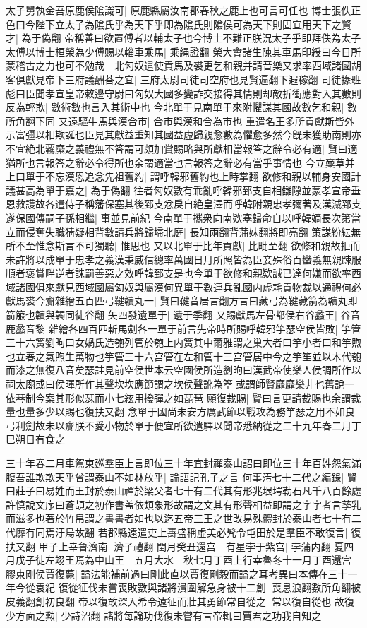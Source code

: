 太子舅執金吾原鹿侯隂識可|{
	原鹿縣屬汝南郡春秋之鹿上也可言可任也}
博士張佚正色曰今陛下立太子為隂氏乎為天下乎即為隂氏則隂侯可為天下則固宜用天下之賢才|{
	為于偽翻}
帝稱善曰欲置傅者以輔太子也今博士不難正朕況太子乎即拜佚為太子太傅以博士桓榮為少傅賜以輜車乘馬|{
	乘䋲證翻}
榮大會諸生陳其車馬印綬曰今日所蒙稽古之力也可不勉哉　北匈奴遣使貢馬及裘更乞和親并請音樂又求率西域諸國胡客俱獻見帝下三府議酬荅之宜|{
	三府太尉司徒司空府也見賢遍翻下遐稼翻}
司徒掾班彪曰臣聞孝宣皇帝敕邊守尉曰匈奴大國多變詐交接得其情則却敵折衝應對入其數則反為輕欺|{
	數術數也言入其術中也}
今北單于見南單于來附懼謀其國故數乞和親|{
	數所角翻下同}
又遠驅牛馬與漢合市|{
	合市與漢和合為市也}
重遣名王多所貢獻斯皆外示富彊以相欺誕也臣見其獻益重知其國益虚歸親愈數為懼愈多然今旣未獲助南則亦不宜絶北覊縻之義禮無不答謂可頗加賞賜略與所獻相當報答之辭令必有適|{
	賢曰適猶所也言報答之辭必令得所也余謂適當也言報答之辭必有當乎事情也}
今立稾草并上曰單于不忘漢恩追念先祖舊約|{
	謂呼韓邪舊約也上時掌翻}
欲修和親以輔身安國計議甚高為單于嘉之|{
	為于偽翻}
往者匈奴數有乖亂呼韓邪郅支自相讎隙並蒙孝宣帝垂恩救護故各遣侍子稱藩保塞其後郅支忿戾自絶皇澤而呼韓附親忠孝彌著及漢滅郅支遂保國傳嗣子孫相繼|{
	事並見前紀}
今南單于攜衆向南欵塞歸命自以呼韓嫡長次第當立而侵奪失職猜疑相背數請兵將歸埽北庭|{
	長知兩翻背蒲妹翻將即亮翻}
策謀紛紜無所不至惟念斯言不可獨聽|{
	惟思也}
又以北單于比年貢獻|{
	比毗至翻}
欲修和親故拒而未許將以成單于忠孝之義漢秉威信總率萬國日月所照皆為臣妾殊俗百蠻義無親踈服順者褒賞畔逆者誅罰善惡之效呼韓郅支是也今單于欲修和親欵誠已達何嫌而欲率西域諸國俱來獻見西域國屬匈奴與屬漢何異單于數連兵亂國内虚耗貢物裁以通禮何必獻馬裘今齎雜繒五百匹弓鞬韥丸一|{
	賢曰鞬音居言翻方言曰藏弓為鞬藏箭為韥丸即箭箙也韥與韣同徒谷翻}
矢四發遺單于|{
	遺于季翻}
又賜獻馬左骨都侯右谷蠡王|{
	谷音鹿蠡音黎}
雜繒各四百匹斬馬劍各一單于前言先帝時所賜呼韓邪竽瑟空侯皆敗|{
	竽管三十六簧劉昫曰女媧氏造匏列管於匏上内簧其中爾雅謂之巢大者曰竽小者曰和竽煦也立春之氣煦生萬物也竽管三十六宫管在左和管十三宫管居中今之竽笙並以木代匏而漆之無復八音矣瑟註見前空侯世本云空國侯所造劉昫曰漢武帝使樂人侯調所作以祠太廟或曰侯暉所作其聲坎坎應節謂之坎侯聲訛為箜或謂師賢靡靡樂非也舊說一依琴制今案其形似瑟而小七絃用撥彈之如琵琶}
願復裁賜|{
	賢曰言更請裁賜也余謂裁量也量多少以賜也復扶又翻}
念單于國尚未安方厲武節以戰攻為務竽瑟之用不如良弓利劍故未以齎朕不愛小物於單于便宜所欲遣驛以聞帝悉納從之二十九年春二月丁巳朔日有食之

三十年春二月車駕東廵羣臣上言即位三十年宜封禪泰山詔曰即位三十年百姓怨氣滿腹吾誰欺欺天乎曾謂泰山不如林放乎|{
	論語記孔子之言}
何事汚七十二代之編錄|{
	賢曰莊子曰易姓而王封於泰山禪於梁父者七十有二代其有形兆垠堮勒石凡千八百餘處許慎說文序曰蒼頡之初作書盖依類象形故謂之文其有形聲相益即謂之字字者言孶乳而滋多也著於竹帛謂之書書者如也以迄五帝三王之世改易殊體封於泰山者七十有二代靡有同焉汙烏故翻}
若郡縣遠遣吏上夀盛稱虛美必髠令屯田於是羣臣不敢復言|{
	復扶又翻}
甲子上幸魯濟南|{
	濟子禮翻}
閏月癸丑還宫　有星孛于紫宫|{
	孛蒲内翻}
夏四月戊子徙左翊王焉為中山王　五月大水　秋七月丁酉上行幸魯冬十一月丁酉還宫　膠東剛侯賈復薨|{
	謚法能補前過曰剛此直以賈復剛毅而謚之耳考異曰本傳在三十一年今從袁紀}
復從征伐未嘗喪敗數與諸將潰圍解急身被十二創|{
	喪息浪翻數所角翻被皮義翻創初良翻}
帝以復敢深入希令遠征而壯其勇節常自從之|{
	常以復自從也}
故復少方面之勲|{
	少詩沼翻}
諸將每論功伐復未嘗有言帝輒曰賈君之功我自知之

